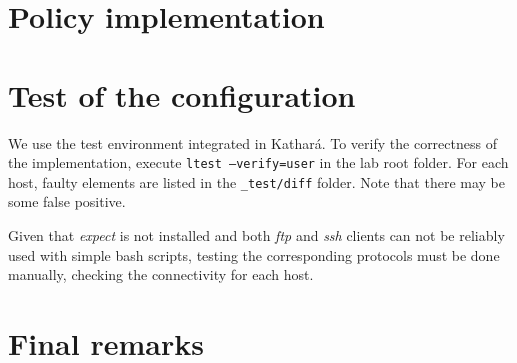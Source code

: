 \documentclass[draft]{homework}
\newcommand{\kat}{Kathará\xspace}
\begin{document}
    
    \section{Policy implementation}
    
    
    \section{Test of the configuration}
    We use the test environment integrated in \kat.
    To verify the correctness of the implementation, execute \texttt{ltest --verify=user} in the lab root folder.
    For each host, faulty elements are listed in the \texttt{\_test/diff} folder.
    Note that there may be some false positive.
    
    Given that \textit{expect} is not installed and both \textit{ftp} and \textit{ssh} clients can not be reliably used with simple bash scripts, testing the corresponding protocols must be done manually, checking the connectivity for each host.
    
    
    \section{Final remarks}
\end{document}
